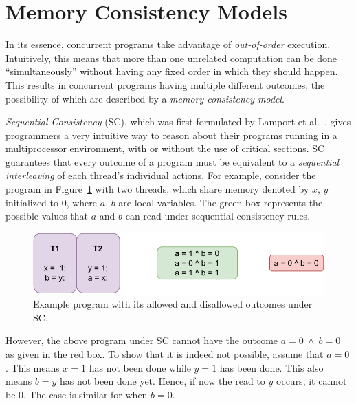 \section{Memory Consistency Models}

    In its essence, concurrent programs take advantage of \textit{out-of-order} execution. 
    Intuitively, this means that more than one unrelated computation can be done ``simultaneously'' without having any fixed order in which they should happen.
    This results in concurrent programs having multiple different outcomes, the possibility of which are described by a \textit{memory consistency model}. 
    
    \textit{Sequential Consistency} (SC), which was first formulated by Lamport et al.~\cite{Lamport79}, gives programmers a very intuitive way to reason about their programs running in a multiprocessor environment, with or without the use of critical sections.
    SC guarantees that every outcome of a program must be equivalent to a \textit{sequential interleaving} of each thread's individual actions. 
    For example, consider the program in Figure~\ref{intro:Example} with two threads, which share memory denoted by $x$, $y$ initialized to 0, where $a$, $b$ are local variables. 
    The green box represents the possible values that $a$ and $b$ can read under sequential consistency rules.
    \begin{figure}[H]
        \centering
        \includegraphics[scale=0.7]{2.Background/SC_Example1(a).pdf}
        \caption{Example program with its allowed and disallowed outcomes under SC.}
        \label{intro:Example}
    \end{figure}
    
    However, the above program under SC cannot have the outcome $a=0\ \wedge\ b=0$ as given in the red box. 
    To show that it is indeed not possible, assume that $a=0$. This means $x=1$ has not been done while $y=1$ has been done. 
    This also means $b=y$ has not been done yet. 
    Hence, if now the read to $y$ occurs, it cannot be $0$. The case is similar for when $b=0$. 
    

